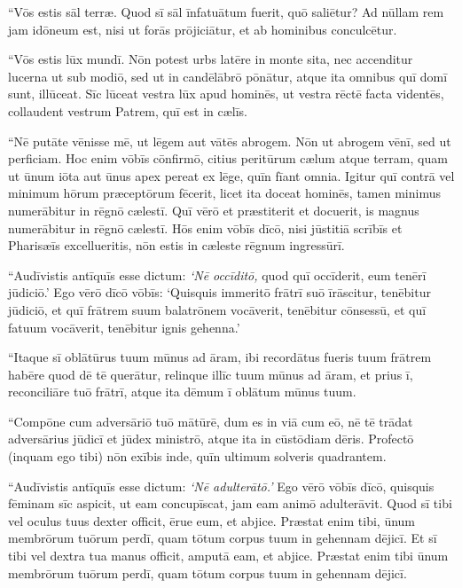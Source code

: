 \Versus ``Vōs estis sāl terræ. Quod sī sāl īnfatuātum fuerit, quō saliētur? Ad nūllam rem jam idōneum est, nisi ut forās prōjiciātur, et ab hominibus conculcētur.

\Versus ``Vōs estis lūx mundī. Nōn potest urbs latēre in monte sita, 
\Versus nec accenditur lucerna ut sub modiō, sed ut in candēlābrō pōnātur, atque ita omnibus quī domī sunt, illūceat. 
\Versus Sīc lūceat vestra lūx apud hominēs, ut vestra rēctē facta videntēs, collaudent vestrum Patrem, quī est in cælīs.

\Versus ``Nē putāte vēnisse mē, ut lēgem aut vātēs abrogem. Nōn ut abrogem vēnī, sed ut perficiam. 
\Versus Hoc enim vōbīs cōnfirmō, citius peritūrum cælum atque terram, quam ut ūnum iōta aut ūnus apex pereat ex lēge, quīn fīant omnia. 
\Versus Igitur quī contrā vel minimum hōrum præceptōrum fēcerit, licet ita doceat hominēs, tamen minimus numerābitur in rēgnō cælestī. Quī vērō et præstiterit et docuerit, is magnus numerābitur in rēgnō cælestī. 
\Versus Hōs enim vōbīs dīcō, nisi jūstitiā scrībīs et Pharisæīs excellueritis, nōn estis in cæleste rēgnum ingressūrī.

\Versus ``Audīvistis antīquīs esse dictum: \emph{`Nē occīditō,} quod quī occīderit, eum tenērī jūdiciō.' 
\Versus Ego vērō dīcō vōbīs: `Quisquis immeritō frātrī suō īrāscitur, tenēbitur jūdiciō, et quī frātrem suum balatrōnem vocāverit, tenēbitur cōnsessū, et quī fatuum vocāverit, tenēbitur ignis gehenna.'

\Versus ``Itaque sī oblātūrus tuum mūnus ad āram, ibi recordātus fueris tuum frātrem habēre quod dē tē querātur, 
\Versus relinque illīc tuum mūnus ad āram, et prius ī, reconciliāre tuō frātrī, atque ita dēmum ī oblātum mūnus tuum. 

\Versus ``Compōne cum adversāriō tuō mātūrē, dum es in viā cum eō, nē tē trādat adversārius jūdicī et jūdex ministrō, atque ita in cūstōdiam dēris. 
\Versus Profectō (inquam ego tibi) nōn exībis inde, quīn ultimum solveris quadrantem.

\Versus ``Audīvistis antīquīs esse dictum: \emph{`Nē adulterātō.'}
\Versus Ego vērō vōbīs dīcō, quisquis fēminam sīc aspicit, ut eam concupīscat, jam eam animō adulterāvit. 
\Versus Quod sī tibi vel oculus tuus dexter officit, ērue eum, et abjice. Præstat enim tibi, ūnum membrōrum tuōrum perdī, quam tōtum corpus tuum in gehennam dējicī. 
\Versus Et sī tibi vel dextra tua manus officit, amputā eam, et abjice. Præstat enim tibi ūnum membrōrum tuōrum perdī, quam tōtum corpus tuum in gehennam dējicī.

